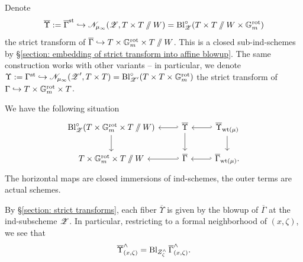 \begin{notation}
Denote 
\begin{equation*}
 \overline{\Upsilon} := \overline{\Gamma}^{\mathrm{st}} \hookrightarrow \mathscr{N}_{\mu_{\infty}}(\operatorname{\mathscr{Z}}, T \times T\sslash W) = \operatorname{Bl}^{\circ}_{\operatorname{\mathscr{Z}}}(T \times T\sslash W \times \mathbb{G}_m^{\mathrm{rot}})   
\end{equation*}
the strict transform of $\overline{\Gamma} \hookrightarrow T \times \mathbb{G}_m^{\mathrm{rot}} \times T \sslash W$.
This is a closed sub-ind-schemes by \S \ref{section: embedding of strict transform into affine blowup}.
%
The same construction works with other variants -- in particular, we denote ${\Upsilon} := {\Gamma}^{\mathrm{st}} \hookrightarrow \mathscr{N}_{\mu_{\infty}}(\operatorname{\mathscr{Z}}', T \times T) = \operatorname{Bl}^{\circ}_{\operatorname{\mathscr{Z}}'}(T \times T \times \mathbb{G}_m^{\mathrm{rot}})$ the strict transform of $\Gamma \hookrightarrow T \times \mathbb{G}_m^{\mathrm{rot}} \times T$.
\end{notation}
%
We have the following situation
\begin{equation}\label{equation: Gamma and Upsilon}
\begin{tikzcd}
\Bl^{\circ}_{\eZ}(T \times \Gm^{\rot} \times T \sslash W) \arrow[d] \arrow[r, hookleftarrow] & \overline{\Upsilon}  \arrow[r, hookleftarrow] \arrow[d] & \overline{\Upsilon}_{\wt(\mu)} \arrow[d] \\
T \times \Gm^{\rot} \times T \sslash W \arrow[r, hookleftarrow] & \overline{\Gamma} \arrow[r, hookleftarrow] & \overline{\Gamma}_{\wt(\mu)}.   
\end{tikzcd}
\end{equation}
The horizontal maps are closed immersions of ind-schemes, the outer terms are actual schemes.





By \S \ref{section: strict transforms}, each fiber $\overline{\Upsilon}$ is given by the blowup of $\overline{\Gamma}$ at the ind-subscheme $\operatorname{\mathscr{Z}}$. In particular, restricting to a formal neighborhood of $(x, \zeta)$, we see that
\begin{equation*}
    \overline{\Upsilon}^{\wedge}_{(x, \zeta)} = \operatorname{Bl}_{Z^{\wedge}_{\zeta}} \overline{\Gamma}^{\wedge}_{(x, \zeta)}.
\end{equation*}


